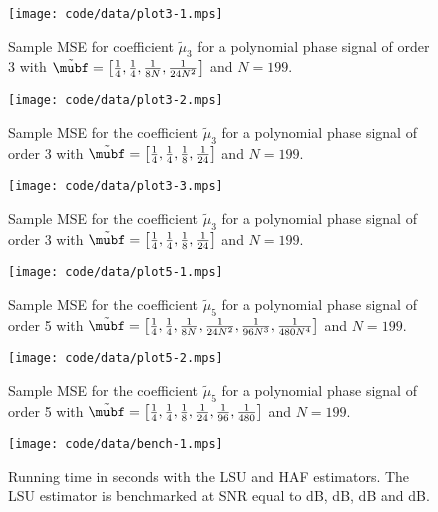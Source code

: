 \documentclass[journal]{IEEEtran}
\begin{document}
\begin{figure}[p] 
   	\centering 
  		\texttt{[image: code/data/plot3-1.mps]} 
  		\caption{Sample MSE for coefficient $\tilde{\mu}_3$ for a polynomial phase signal of order 3 with $\tilde{\mubf} = \left[ \tfrac{1}{4}, \tfrac{1}{4}, \tfrac{1}{8N}, \tfrac{1}{24N^2}  \right]$ and $N=199$.} 
  		\label{plot:m3small} 
 \end{figure} 

\begin{figure}[p] 
   	\centering 
  		\texttt{[image: code/data/plot3-2.mps]} 
  		\caption{Sample MSE for the coefficient $\tilde{\mu}_3$ for a polynomial phase signal of order 3 with $\tilde{\mubf} = \left[ \tfrac{1}{4}, \tfrac{1}{4}, \tfrac{1}{8}, \tfrac{1}{24}  \right]$ and $N=199$.} 
  		\label{plot:m3big} 
 \end{figure} 

\begin{figure}[p] 
   	\centering 
  		\texttt{[image: code/data/plot3-3.mps]} 
  		\caption{Sample MSE for the coefficient $\tilde{\mu}_3$ for a polynomial phase signal of order 3 with $\tilde{\mubf} = \left[ \tfrac{1}{4}, \tfrac{1}{4}, \tfrac{1}{8}, \tfrac{1}{24}  \right]$ and $N=199$.} 
  		\label{plot:m3bigzw} 
 \end{figure} 

\begin{figure}[p] 
   	\centering 
  		\texttt{[image: code/data/plot5-1.mps]} 
  		\caption{Sample MSE for the coefficient $\tilde{\mu}_5$ for a polynomial phase signal of order 5 with $\tilde{\mubf} = \left[ \tfrac{1}{4}, \tfrac{1}{4}, \tfrac{1}{8N}, \tfrac{1}{24N^2}, \tfrac{1}{96N^3}, \tfrac{1}{480N^4} \right]$ and $N=199$.} 
  		\label{plot:m5} 
\end{figure} 

\begin{figure}[p] 
   	\centering 
  		\texttt{[image: code/data/plot5-2.mps]} 
  		\caption{Sample MSE for the coefficient $\tilde{\mu}_5$ for a polynomial phase signal of order 5 with $\tilde{\mubf} = \left[ \tfrac{1}{4}, \tfrac{1}{4}, \tfrac{1}{8}, \tfrac{1}{24}, \tfrac{1}{96}, \tfrac{1}{480}   \right]$ and $N=199$.} 
  		\label{plot:m5big} 
\end{figure} 

\begin{figure}[p] 
   	\centering 
  		\texttt{[image: code/data/bench-1.mps]} 
  		\caption{Running time in seconds with the LSU and HAF estimators.  The LSU estimator is benchmarked at SNR equal to \unit[0]{dB}, \unit[5]{dB}, \unit[10]{dB} and \unit[20]{dB}.} 
  		\label{plot:bench} 
\end{figure} 
\end{document}
